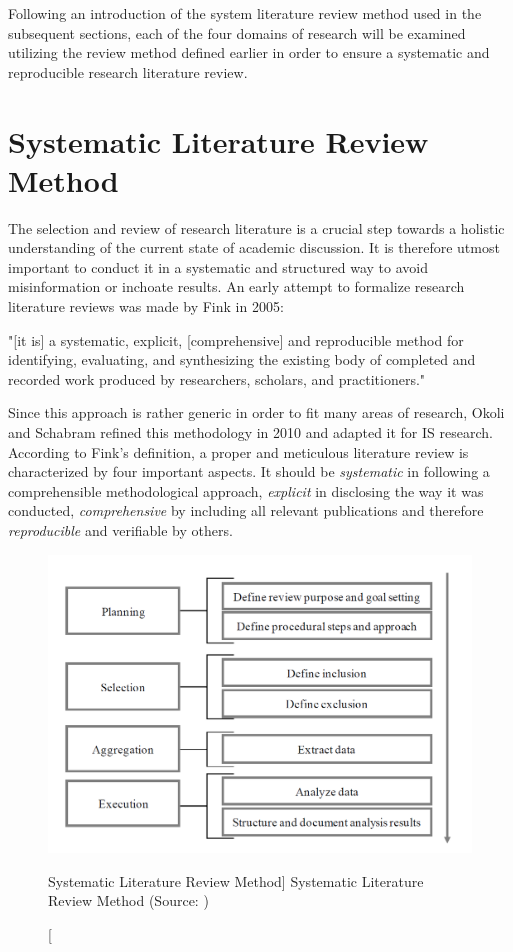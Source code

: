 Following an introduction of the system literature review method used in the subsequent sections, each of the four domains of research will be examined utilizing the review method defined earlier in order to ensure a systematic and reproducible research literature review. 

\section{Systematic Literature Review Method}\label{sec:LitRes}

The selection and review of research literature is a crucial step towards a holistic understanding of the current state of academic discussion. It is therefore utmost important to conduct it in a systematic and structured way to avoid misinformation or inchoate results. An early attempt to formalize research literature reviews was made by Fink in 2005:

\begin{displayquote}
    "[it is] a systematic, explicit,
    [comprehensive] and reproducible method for identifying, evaluating, and synthesizing
    the existing body of completed and recorded work produced by researchers, scholars, and
    practitioners."\autocite{Fink2015ConductingPaper}
\end{displayquote}

Since this approach is rather generic in order to fit many areas of research, Okoli and Schabram refined this methodology in 2010 and adapted it for \acf{IS} research. \\
According to Fink's definition, a proper and meticulous literature review is characterized by four important aspects. It should be \textit{systematic} in following a comprehensible methodological approach, \textit{explicit} in disclosing the way it was conducted, \textit{comprehensive} by including all relevant publications and therefore \textit{reproducible} and verifiable by others. 

\begin{figure}[ht]
    \includegraphics[width=0.8\linewidth]{images/methodology/litSearc.png}\centering
    \caption
    [Systematic Literature Review Method]
    {Systematic Literature Review Method (Source: \cite{Okoli2010AResearch})}
    \label{fig:litSearch}
\end{figure}

